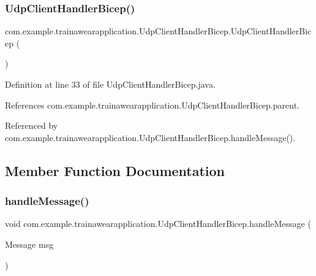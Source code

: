 \subsubsection{\texorpdfstring{UdpClientHandlerBicep()}{UdpClientHandlerBicep()}}
{\footnotesize\ttfamily com.\+example.\+trainawearapplication.\+Udp\+Client\+Handler\+Bicep.\+Udp\+Client\+Handler\+Bicep (\begin{DoxyParamCaption}{ }\end{DoxyParamCaption})}



Definition at line 33 of file Udp\+Client\+Handler\+Bicep.\+java.


\begin{DoxyCode}{0}

\end{DoxyCode}


References com.\+example.\+trainawearapplication.\+Udp\+Client\+Handler\+Bicep.\+parent.



Referenced by com.\+example.\+trainawearapplication.\+Udp\+Client\+Handler\+Bicep.\+handle\+Message().



\subsection{Member Function Documentation}
\mbox{\label{classcom_1_1example_1_1trainawearapplication_1_1_udp_client_handler_bicep_a083761d7050084ba7f64723dc178487a}} 
\subsubsection{\texorpdfstring{handleMessage()}{handleMessage()}}
{\footnotesize\ttfamily void com.\+example.\+trainawearapplication.\+Udp\+Client\+Handler\+Bicep.\+handle\+Message (\begin{DoxyParamCaption}\item[{Message}]{msg }\end{DoxyParamCaption})}



